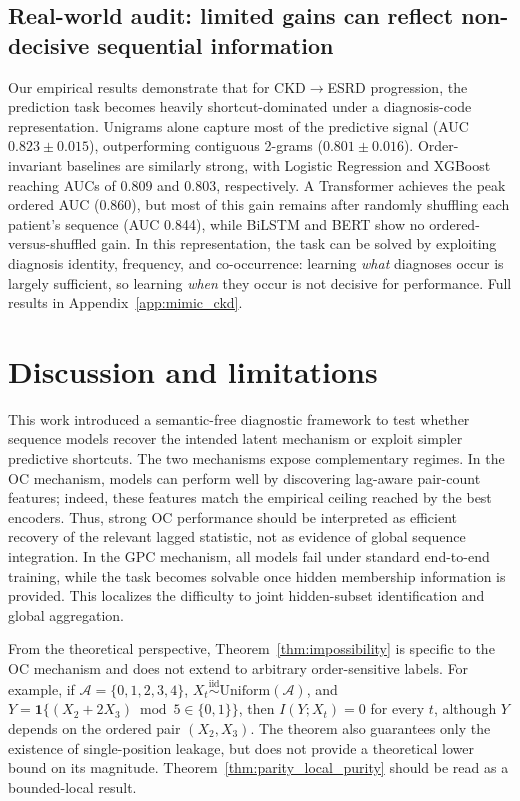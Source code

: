 \documentclass{article} %
\theoremstyle{plain}
\theoremstyle{definition}
\theoremstyle{remark}
\begin{document}
\subsection{Real-world audit: limited gains can reflect non-decisive sequential information}
\label{sec:mimic_ckd_results}
Our empirical results demonstrate that for CKD$\to$ESRD progression, the prediction task becomes heavily shortcut-dominated under a diagnosis-code representation. Unigrams alone capture most of the predictive signal (AUC $0.823 \pm 0.015$), outperforming contiguous 2-grams ($0.801 \pm 0.016$). Order-invariant baselines are similarly strong, with Logistic Regression and XGBoost reaching AUCs of 0.809 and 0.803, respectively. A Transformer achieves the peak ordered AUC (0.860), but most of this gain remains after randomly shuffling each patient's sequence (AUC 0.844), while BiLSTM and BERT show no ordered-versus-shuffled gain. In this representation, the task can be solved by exploiting diagnosis identity, frequency, and co-occurrence: learning \emph{what} diagnoses occur is largely sufficient, so learning \emph{when} they occur is not decisive for performance. Full results in Appendix~\ref{app:mimic_ckd}.

\section{Discussion and limitations}
\label{sec:limitations}
This work introduced a semantic-free diagnostic framework to test whether sequence models recover the intended latent mechanism or exploit simpler predictive shortcuts. The two mechanisms expose complementary regimes. In the OC mechanism, models can perform well by discovering lag-aware pair-count features; indeed, these features match the empirical ceiling reached by the best encoders. Thus, strong OC performance should be interpreted as efficient recovery of the relevant lagged statistic, not as evidence of global sequence integration. In the GPC mechanism, all models fail under standard end-to-end training, while the task becomes solvable once hidden membership information is provided. This localizes the difficulty to joint hidden-subset identification and global aggregation.

From the theoretical perspective, Theorem~\ref{thm:impossibility} is specific to the OC mechanism and does not extend to arbitrary order-sensitive labels. For example, if $\mathcal{A}=\{0,1,2,3,4\}$, $X_t \overset{\mathrm{iid}}{\sim} \mathrm{Uniform}(\mathcal{A})$, and $Y=\mathbf{1}\{(X_2+2X_3)\bmod 5 \in \{0,1\}\}$, then $I(Y;X_t)=0$ for every $t$, although $Y$ depends on the ordered pair $(X_2,X_3)$. The theorem also guarantees only the existence of single-position leakage, but does not provide a theoretical lower bound on its magnitude. Theorem~\ref{thm:parity_local_purity} should be read as a bounded-local result.
\end{document}
